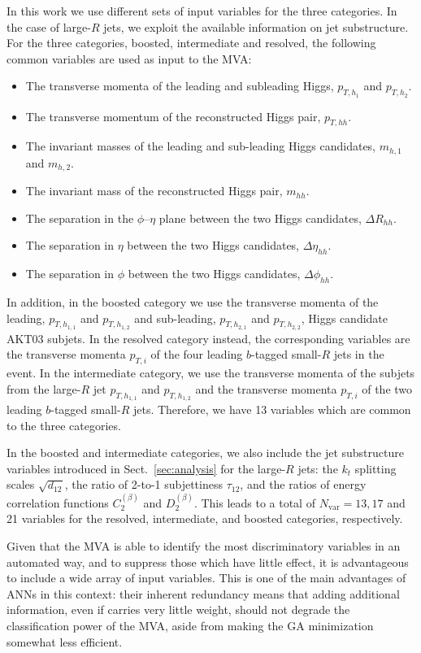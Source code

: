 In this work we use different sets of
input variables for the three categories.
%
In the case of large-$R$ jets, we  exploit the available
information  on jet substructure.
%
For the three categories, boosted, intermediate and resolved,
the following common variables are used as input to the MVA:
\begin{itemize}
\item The transverse momenta of the leading and subleading Higgs, $p_{T,h_1}$ and $p_{T,h_2}$.
\item The transverse momentum of the reconstructed Higgs pair, $p_{T,hh}$.
\item The invariant masses of the leading and sub-leading Higgs candidates, $m_{h,1}$ and $m_{h,2}$.
\item The invariant mass of the reconstructed Higgs pair, $m_{hh}$.
\item The separation in the $\phi$--$\eta$ plane
  between the two Higgs candidates, $\Delta R_{hh}$.
  \item The separation in $\eta$  between the two Higgs candidates, $\Delta \eta_{hh}$.
\item The separation in $\phi$  between the two Higgs candidates, $\Delta \phi_{hh}$.
\end{itemize}
In addition, in the boosted category we use
  the transverse momenta of the leading, $p_{T,h_{1,1}}$ and $p_{T,h_{1,2}}$ and
  sub-leading, $p_{T,h_{2,1}}$ and $p_{T,h_{2,2}}$, Higgs candidate AKT03 subjets.
  In the resolved category instead,
  the corresponding variables are
  the transverse momenta $p_{T,i}$ of the four leading 
  $b$-tagged small-$R$ jets in the event.
  In the intermediate category, we use the
  transverse momenta of the subjets
  from the large-$R$ jet $p_{T,h_{1,1}}$ and $p_{T,h_{1,2}}$ and the
 transverse momenta $p_{T,i}$ of the two leading 
  $b$-tagged small-$R$ jets.
 Therefore, we have 13 variables which are common to the three categories.

 In the boosted and intermediate categories, we also include the jet substructure
 variables introduced in Sect.~\ref{sec:analysis} for the
 large-$R$ jets: the $k_t$ splitting scales
 $\sqrt{d_{12}}$, the ratio of 2-to-1 subjettiness $\tau_{12}$,
 and the ratios of energy correlation functions $C^{(\beta)}_2$ and
 $D_2^{(\beta)}$.
 This leads to
 a total of $N_{\mathrm{var}}=13,17$ and 21 variables for the
resolved, intermediate, and boosted categories, respectively.


Given that the MVA is able to identify the most discriminatory variables
in an automated way,
and to suppress those which have little effect, it is advantageous to
include a wide array of input variables.
%
This is one of the main advantages of ANNs in this context: 
their inherent redundancy means that 
adding additional information, even if carries very little weight,
should not degrade
the classification power of the MVA, aside from making the GA
minimization somewhat less efficient.

